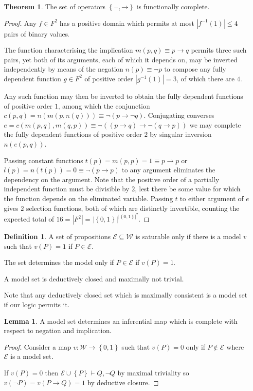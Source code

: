 \documentclass{amsbook}
\newcommand{\setsm}[1]{\left\{#1\right\}}
\newcommand{\wffs}{\mathcal W}
\newcommand{\infers}{\mathrel\vdash}
\newcommand{\then}{\mathrel\rightarrow}
\theoremstyle{definition}
\newtheorem{thm}{Theorem}[section]
\newtheorem{lmm}{Lemma}[section]
\newtheorem{dfn}{Definition}[section]
\begin{document}
\begin{thm}
    The set of operators $\setsm{\mathord{\neg}, \mathord{\then}}$ is functionally complete.
    \begin{proof}
        Any $f \in F^2$ has a positive domain which permits at most $|f^{-1}(1)| \leq 4$ pairs of binary values.

        The function characterising the implication $m(p,q) \equiv p \then q$ permits three such pairs, yet both of its arguments, each of which it depends on, may be inverted independently by means of the negation $n(p) \equiv \neg p$ to compose any fully dependent function $g \in F^2$ of positive order $|g^{-1}(1)| = 3$, of which there are $4$.

        Any such function may then be inverted to obtain the fully dependent functions of positive order $1$, among which the conjunction $c(p, q) = n(m(p, n(q))) \equiv \neg(p \then \neg q)$. Conjugating converses $e = c(m(p, q), m(q, p)) \equiv \neg((p \then q) \then \neg(q \then p))$ we may complete the fully dependent functions of positive order $2$ by singular inversion $n(e(p,q))$.

        Passing constant functions $t(p) = m(p, p) = 1 \equiv p \then p$ or $l(p) = n(t(p)) = 0 \equiv \neg(p\then p)$ to any argument eliminates the dependency on the argument. Note that the positive order of a partially independent function must be divisible by $2$, lest there be some value for which the function depends on the eliminated variable. Passing $t$ to either argument of $e$ gives $2$ selection functions, both of which are distinctly invertible, counting the expected total of $16 = |F^2| = |\setsm{0,1}|^{|\setsm{0,1}|^2}$.
    \end{proof}
\end{thm}

\begin{dfn}
    A set of propositions $\mathcal E \subseteq \wffs$ is saturable only if there is a model $v$ such that $v(P) = 1$ if $P \in \mathcal E$.

    The set determines the model only if $P \in \mathcal E$ if $v(P) = 1$.

    A model set is deductively closed and maximally not trivial.
\end{dfn}

Note that any deductively closed set which is maximally consistent is a model set if our logic permits it.

\begin{lmm}
    A model set determines an inferential map which is complete with respect to negation and implication.
    \begin{proof}
        Consider a map $v: \wffs \longrightarrow \setsm{0,1}$ such that $v(P) = 0$ only if $P \notin \mathcal E$ where $\mathcal E$ is a model set.

        If $v(P) = 0$ then $\mathcal E \cup \setsm P \infers Q, \neg Q$ by maximal triviality so $v(\neg P) = v(P \then Q) = 1$ by deductive closure.
    \end{proof}
\end{lmm}
\end{document}
